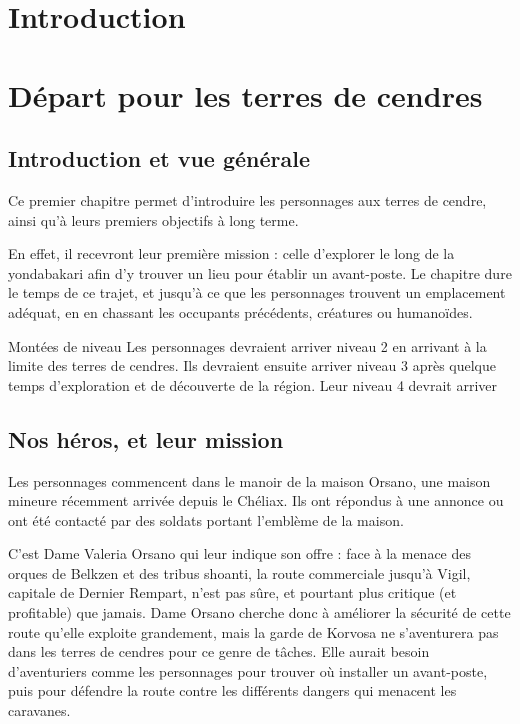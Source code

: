 \documentclass[letterpaper,10pt,twoside,twocolumn,openany]{book}
\title{\cftchapfont   \nomcampagne}
\date{}
\author{}
\begin{document}
\maketitle
\tableofcontents
\chapter{Introduction}
\chapter{Départ pour les terres de cendres}
\section{Introduction et vue générale}
Ce premier chapitre permet d'introduire les personnages aux terres de cendre, ainsi qu'à leurs premiers objectifs à long terme.

En effet, il recevront leur première mission : celle d'explorer le long de la yondabakari afin d'y trouver un lieu pour établir un avant-poste. Le chapitre dure le temps de ce trajet, et jusqu'à ce que les personnages trouvent un emplacement adéquat, en en chassant les occupants précédents, créatures ou humanoïdes.
\begin{commentbox}{Montées de niveau}
Les personnages devraient arriver niveau 2 en arrivant à la limite des terres de cendres. Ils devraient ensuite arriver niveau 3 après quelque temps d'exploration et de découverte de la région. Leur niveau 4 devrait arriver 
\end{commentbox}
\section{Nos héros, et leur mission}
Les personnages commencent dans le manoir de la maison Orsano, une maison mineure récemment arrivée depuis le Chéliax. Ils ont répondus à une annonce ou ont été contacté par des soldats portant l'emblème de la maison.

C'est Dame Valeria Orsano qui leur indique son offre : face à la menace des orques de Belkzen et des tribus shoanti, la route commerciale jusqu'à Vigil, capitale de Dernier Rempart, n'est pas sûre, et pourtant plus critique (et profitable) que jamais. Dame Orsano cherche donc à améliorer la sécurité de cette route qu'elle exploite grandement, mais la garde de Korvosa ne s'aventurera pas dans les terres de cendres pour ce genre de tâches. Elle aurait besoin d'aventuriers comme les personnages pour trouver où installer un avant-poste, puis pour défendre la route contre les différents dangers qui menacent les caravanes.
\end{document}
